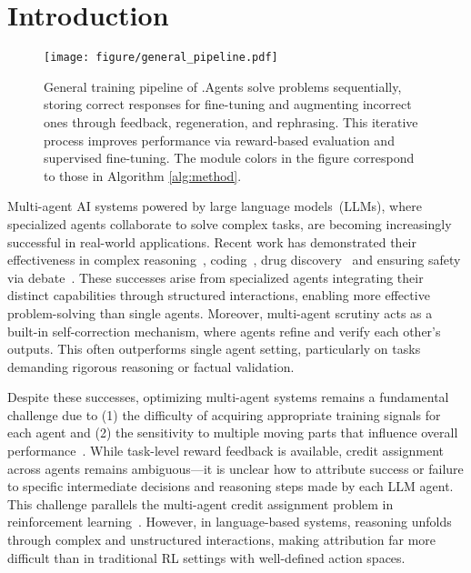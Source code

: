 \section{Introduction} 
\begin{figure*}[htbp]
    \centering
    \texttt{[image: figure/general\_pipeline.pdf]}
    \caption{General training pipeline of \model.Agents solve problems sequentially, storing correct responses for fine-tuning and augmenting incorrect ones through feedback, regeneration, and rephrasing. This iterative process improves performance via reward-based evaluation and supervised fine-tuning. The module colors in the figure correspond to those in Algorithm \ref{alg:method}.
}
    \label{fig:pipeline}
\end{figure*}

Multi-agent AI systems powered by large language models~(LLMs), where specialized agents collaborate to solve complex tasks, are becoming increasingly successful in real-world applications. Recent work has demonstrated their effectiveness in complex reasoning~\citep{wang2024mixture, smitshould}, coding~\citep{wu2023autogen}, drug discovery~\citep{swanson2024virtual} and ensuring safety via debate~\citep{chern2024combating, irving2018ai}. 
These successes arise from specialized agents integrating their distinct capabilities through structured interactions, enabling more effective problem-solving than single agents. Moreover, multi-agent scrutiny acts as a built-in self-correction mechanism, where agents refine and verify each other’s outputs. This often outperforms single agent setting, particularly on tasks demanding rigorous reasoning or factual validation.

Despite these successes, optimizing multi-agent systems remains a fundamental challenge due to (1) the difficulty of acquiring appropriate training signals for each agent and (2) the sensitivity to multiple moving parts that influence overall performance~\citep{smitshould}. While task-level reward feedback is available, credit assignment across agents remains ambiguous—it is unclear how to attribute success or failure to specific intermediate decisions and reasoning steps made by each LLM agent. This challenge parallels the multi-agent credit assignment problem in reinforcement learning~\citep{foerster2018counterfactual}. However, in language-based systems, reasoning unfolds through complex and unstructured interactions, making attribution far more difficult than in traditional RL settings with well-defined action spaces.

